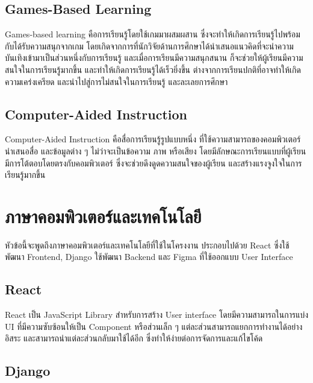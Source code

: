 \documentclass[12pt,oneside,openright,a4paper]{cpe-thai-project}
\begin{document}
\subsection{Games-Based Learning}

\hspace{1cm}
Games-based learning \cite{GBL} คือการเรียนรู้โดยใช้เกมมาผสมผสาน ซึ่งจะทำให้เกิดการเรียนรู้ไปพร้อมกับได้รับความสนุกจากเกม
โดยเกิดจากการที่นักวิจัยด้านการศึกษาได้นำเสนอแนวคิดที่จะนำความบันเทิงเข้ามาเป็นส่วนหนึ่งกับการเรียนรู้ และเมื่อการเรียนมีความสนุกสนาน
ก็จะช่วยให้ผู้เรียนมีความสนใจในการเรียนรู้มากขึ้น และทำให้เกิดการเรียนรู้ได้เร็วยิ่งขึ้น ต่างจากการเรียนปกติที่อาจทำให้เกิดความเคร่งเครียด
และนำไปสู่การไม่สนใจในการเรียนรู้ และละเลยการศึกษา

\subsection{Computer-Aided Instruction}

\hspace{1cm}
Computer-Aided Instruction \cite{CAI1,CAI2} คือสื่อการเรียนรู้รูปแบบหนึ่ง ที่ใช้ความสามารถของคอมพิวเตอร์นำเสนอสื่อ และข้อมูลต่าง ๆ
ไม่ว่าจะเป็นข้อความ ภาพ หรือเสียง โดยมีลักษณะการเรียนแบบที่ผู้เรียนมีการโต้ตอบโดยตรงกับคอมพิวเตอร์
ซึ่งจะช่วยดึงดูดความสนใจของผู้เรียน และสร้างแรงจูงใจในการเรียนรู้มากขึ้น


\pagebreak
\section{ภาษาคอมพิวเตอร์และเทคโนโลยี}

\hspace{1cm}
หัวข้อนี้จะพูดถึงภาษาคอมพิวเตอร์และเทคโนโลยีที่ใช้ในโครงงาน ประกอบไปด้วย React
ซึ่งใช้พัฒนา Frontend, Django ใช้พัฒนา Backend และ Figma ที่ใช้ออกแบบ User Interface

\subsection{React}

\hspace{1cm}
React \cite{React} เป็น JavaScript Library สำหรับการสร้าง User interface โดยมีความสามารถในการแบ่ง UI ที่มีความซับซ้อนให้เป็น Component หรือส่วนเล็ก ๆ
แต่ละส่วนสามารถแยกการทำงานได้อย่างอิสระ และสามารถนำแต่ละส่วนกลับมาใช้ได้อีก ซึ่งทำให้ง่ายต่อการจัดการและแก้ไขโค้ด

\subsection{Django}
\end{document}
